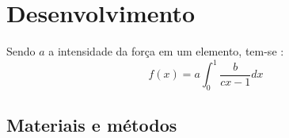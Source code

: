 \chapter{Desenvolvimento} \label{cap:desenvolvimento}
\lipsum[3]
Sendo $a$ a intensidade da força em um elemento, tem-se \cite{knuth:1973}:
    $$ f(x) = a \int_0^1{\frac{b}{cx - 1}}dx $$
\lipsum[4-5]

\section{Materiais e métodos} \label{sec:materiais_metodos}
\lipsum[6]